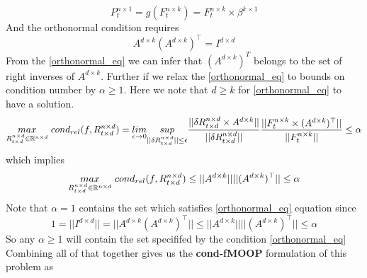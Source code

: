 \begin{equation} \label{g_for_lfm}
P^{n \times 1}_{t} = g(F^{n\times k}_t) = F^{n\times k}_t \times \beta^{k \times 1}
\end{equation}
\newline
And the orthonormal condition requires
\begin{equation} \label{orthonormal_eq}
 A^{d\times k}(A^{d\times k})^{\top} = I^{d\times d}
\end{equation}
\newline
From the \ref{orthonormal_eq} we can infer that $(A^{d\times k})^T$ belongs to the set of right inverses of $A^{d\times k}$. \newline Further if we relax the \ref{orthonormal_eq} to bounds on condition number by $\alpha \ge 1$. Here we note that $d\ge k$ for \ref{orthonormal_eq} to have a solution.
\begin{equation}
    \underset{R^{n\times d}_{t\times d} \in \mathbb{R}^{n\times d}}{max}\hspace{1mm} cond_{rel}(f,R^{n\times d}_{t\times d}) = \underset{\epsilon \to 0}{lim}\underset{||\delta R^{n\times d}_{t\times d}||\le \epsilon}{sup} \frac{||\delta R^{n\times d}_{t\times d}\times A^{d\times k}||}{||\delta R^{n\times d}_{t\times d}||}  \frac{||F^{n\times k}_t \times (A^{d\times k})^{\top} ||}{|| F^{n\times k}_t||}\le \alpha
\end{equation}
which implies\newline
\begin{equation}
    \underset{R^{n\times d}_{t\times d} \in \mathbb{R}^{n\times d}}{max}\hspace{1mm} cond_{rel}(f,R^{n\times d}_{t\times d}) \le ||A^{d\times k}|| ||(A^{d\times k})^{\top} ||\le \alpha
\end{equation}
\newline
Note that $\alpha=1$ contains the set which satisfies \ref{orthonormal_eq} equation since 
\begin{equation}
1= || I^{d\times d}||= || A^{d\times k}(A^{d\times k})^{\top} ||  \le || A^{d\times k}||||(A^{d\times k})^{\top} || \le \alpha
\end{equation}\newline
So any $\alpha \ge 1$ will contain the set specififed by the condition \ref{orthonormal_eq}\newline
Combining all of that together gives us the \textbf{cond-fMOOP} formulation of this problem as

